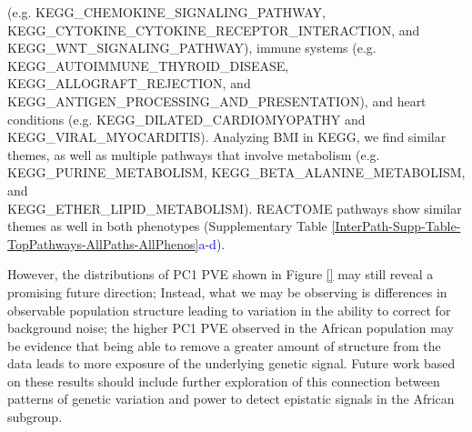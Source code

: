 \documentclass[12pt,a4paper]{article}
\begin{document}
(e.g. KEGG\_CHEMOKINE\_SIGNALING\_PATHWAY, KEGG\_CYTOKINE\_CYTOKINE\_RECEPTOR\_INTERACTION, and \\ KEGG\_WNT\_SIGNALING\_PATHWAY), immune systems (e.g. \\ KEGG\_AUTOIMMUNE\_THYROID\_DISEASE, KEGG\_ALLOGRAFT\_REJECTION, and KEGG\_ANTIGEN\_PROCESSING\_AND\_PRESENTATION), and heart conditions (e.g. KEGG\_DILATED\_CARDIOMYOPATHY and \\ KEGG\_VIRAL\_MYOCARDITIS). Analyzing BMI in KEGG, we find similar themes, as well as multiple pathways that involve metabolism (e.g. KEGG\_PURINE\_METABOLISM, KEGG\_BETA\_ALANINE\_METABOLISM, and \\ KEGG\_ETHER\_LIPID\_METABOLISM). REACTOME pathways show similar themes as well in both phenotypes (Supplementary Table \ref{InterPath-Supp-Table-TopPathways-AllPaths-AllPhenos}\textcolor{blue}{a-d}).








However, the distributions of PC1 PVE shown in Figure \ref{} may still reveal a promising future direction; Instead, what we may be observing is differences in observable population structure leading to variation in the ability to correct for background noise; the higher PC1 PVE observed in the African population may be evidence that being able to remove a greater amount of structure from the data leads to more exposure of the underlying genetic signal. Future work based on these results should include further exploration of this connection between patterns of genetic variation and power to detect epistatic signals in the African subgroup.  
\end{document}
